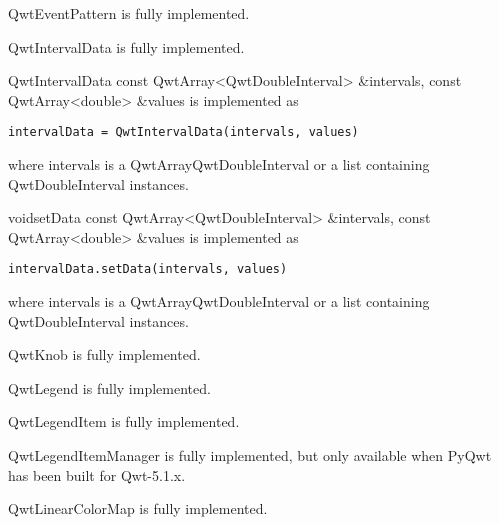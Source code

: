 \documentclass{manual}
\begin{document}
{\begin{classdesc*}{QwtEventPattern}
  is fully implemented.
\end{classdesc*}

\begin{classdesc*}{QwtIntervalData}
  is fully implemented.
  
  \begin{cfuncdesc}{}{QwtIntervalData}{
      const QwtArray<QwtDoubleInterval> \&intervals,
      const QwtArray<double> \&values}
    is implemented as
    \begin{verbatim}
intervalData = QwtIntervalData(intervals, values)
    \end{verbatim}
    where intervals is a QwtArrayQwtDoubleInterval or a list containing
    QwtDoubleInterval instances.
  \end{cfuncdesc}

  \begin{cfuncdesc}{void}{setData}{
      const QwtArray<QwtDoubleInterval> \&intervals,
      const QwtArray<double> \&values}
    is implemented as
    \begin{verbatim}
intervalData.setData(intervals, values)
    \end{verbatim}
    where intervals is a QwtArrayQwtDoubleInterval or a list containing
    QwtDoubleInterval instances.
  \end{cfuncdesc}

\end{classdesc*}

\begin{classdesc*}{QwtKnob}
  is fully implemented.
\end{classdesc*}

\begin{classdesc*}{QwtLegend}
  is fully implemented.
\end{classdesc*}

\begin{classdesc*}{QwtLegendItem}
  is fully implemented.
\end{classdesc*}

\begin{classdesc*}{QwtLegendItemManager}
  is fully implemented, but only available when PyQwt has been built for
  Qwt-5.1.x. 
\end{classdesc*}

\begin{classdesc*}{QwtLinearColorMap}
  is fully implemented.
\end{classdesc*}

}
\end{document}
